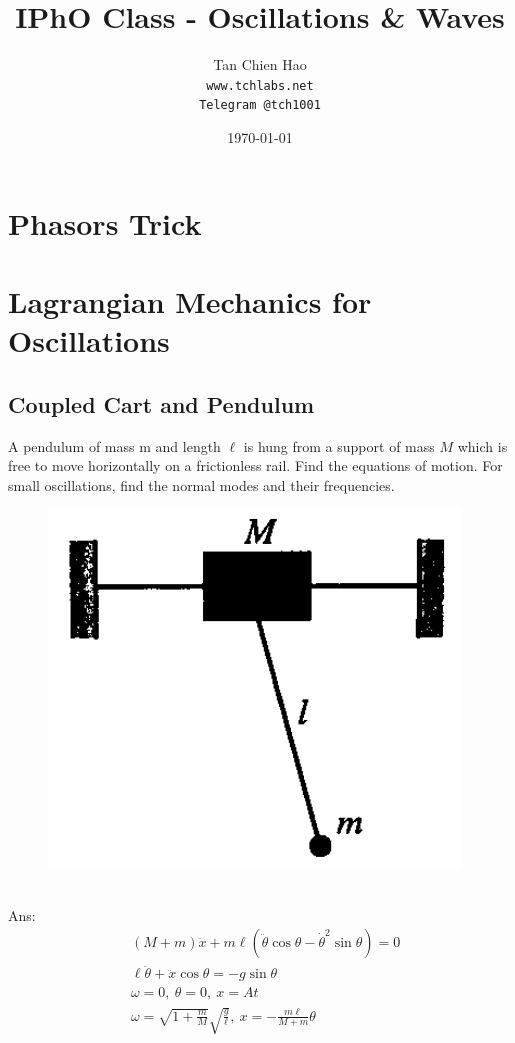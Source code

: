 \documentclass{article}
\title{IPhO Class - Oscillations \& Waves}
\author{
    Tan Chien Hao\\
    \texttt{www.tchlabs.net}\\
    \texttt{Telegram @tch1001}
}
\date{\today}
\begin{document}
\newif\ifpaper

\paperfalse 

\maketitle
\tableofcontents
\section{Phasors Trick}
\section{Lagrangian Mechanics for Oscillations}
\subsection{Coupled Cart and Pendulum}
A pendulum of mass $\mathrm{m}$ and length $\ell$ is hung from a support of mass $M$ which is free to move horizontally on a frictionless rail. Find the equations of motion. For small oscillations, find the normal modes and their frequencies. \\
\begin{figure}[h]
    \centering
\includegraphics[width=0.4\linewidth]{images/cartpendulum.png}
\end{figure}\\
Ans: 
\begin{align}
&(M+m) \ddot{x}+m \ell\left(\ddot{\theta} \cos \theta-\dot{\theta}^2 \sin \theta\right)=0 \\
&\ell \ddot{\theta}+\ddot{x} \cos \theta=-g \sin \theta \\
&\omega=0, \ \theta=0,\ x= A t \\ 
&\omega=\sqrt{1+\frac{m}{M}} \sqrt{\frac{g}{\ell}}, \ x=-\frac{m \ell}{M+m} \theta
\end{align}
\end{document}
